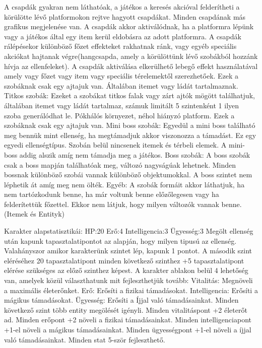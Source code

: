 A csapdák gyakran nem láthatóak, a játékos a keresés akcióval felderítheti a körülötte lévő platformokon rejtve hagyott csapdákat.
Minden csapdának más grafikus megjelenése van.
A csapdák akkor aktiválódnak, ha a platformra lépünk vagy a játékos által egy item kerül eldobásra az adott platformra.
A csapdák rálépésekor különböző főzet effekteket rakhatnak ránk, vagy egyéb speciális akciókat hajtanak végre(hangcsapda, amely a körülöttünk lévő szobákból hozzánk hívja az ellenfeleket).
A csapdák aktiválása elkerülhető lebegő effekt használatával amely vagy főzet vagy item vagy speciális térelemektől szerezhetőek. Ezek a szobáknak csak egy ajtajuk van. Általában itemet vagy ládát tartalmaznak.
Titkos szobák:
Ezeket a szobákat titkos falak vagy zárt ajtók mögött találhatjuk, általában itemet vagy ládát tartalmaz, számuk limitált 5 szintenként 1 ilyen szoba generálódhat le. Pókhálós környezet, néhol hiányzó platform. Ezek a szobáknak csak egy ajtajuk van.
Mini boss szobák:
Egyedül a mini boss található meg bennük mint ellenség, ha megtámadjuk akkor viszonozza a támadást. Ez egy egyedi ellenségtípus. Szobán belül nincsenek itemek és térbeli elemek.
A mini-boss addig alszik amíg nem támadja meg a játékos.
Boss szobák:
A boss szobák csak a boss mapján találhatóak meg, változó nagyságúak lehetnek.
Minden bossnak különböző szobái vannak különböző objektumokkal.
A boss szintet nem léphetik át amíg meg nem ölték.
Egyéb:
A szobák formáit akkor láthatjuk, ha nem tartózkodunk benne, ha már voltunk benne előzőlegesen vagy ha felderítettük főzettel. Ekkor nem látjuk, hogy milyen változók vannak benne. (Itemek és Entityk)


Karakter alapstatisztikái:
HP:20
Erő:4
Intelligencia:3
Ügyesség:3
Megölt ellenség után kapunk tapasztalatipontot az alapján, hogy milyen tipusú az ellenség. Valahányszor amikor karakterünk szintet lép, kapunk 1 pontot.
A második szint eléréséhez 20 tapasztalatipont minden következő szinthez +5 tapasztalatipont elérése szükséges az előző szinthez képest.
A karakter ablakon belül 4 lehetőség van, amelyek közül választhatunk mit fejleszthetjük tovább:
Vitalitás: Megnöveli a maximális életerőnket.
Erő: Erősíti a fizikai támadásokat.
Intelligencia: Erősíti a mágikus támadásokat.
Ügyesség: Erősíti a Íjjal való támadásainkat.
Minden következő szint több entity megölését igényli.
Minden vitalitáspont +2 életerőt ad.
Minden erőpont +2 növeli a fizikai támadásainkat.
Minden intelligenciapont +1-el növeli a mágikus támadásainkat.
Minden ügyességpont +1-el növeli a íjjal való támadásainkat.
Minden stat 5-ször fejleszthető.

